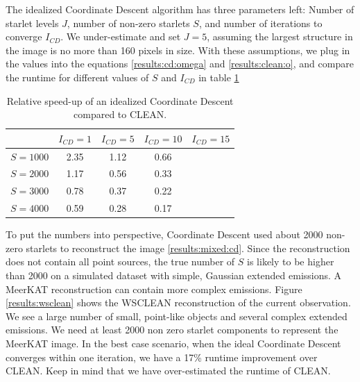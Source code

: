 The idealized Coordinate Descent algorithm has three parameters left: Number of starlet levels $J$, number of non-zero starlets $S$, and number of iterations to converge $I_{CD}$. We under-estimate and set $J=5$, assuming the largest structure in the image is no more than 160 pixels in size. With these assumptions, we plug in the values into the equations \eqref{results:cd:omega} and \eqref{results:clean:o}, and compare the runtime for different values of $S$ and $I_{CD}$ in table \ref{res:cd:table}

\begin{table}[h!]
	\begin{center}
		\begin{tabular}{l|c|c|c|c} %
			 & $I_{CD} = 1$ & $I_{CD} = 5$ &  $I_{CD} = 10$ &  $I_{CD} = 15$\\
			\hline
			$S=1000$ & 2.35 & 1.12 & 0.66 & \\
			$S=2000$ & 1.17 & 0.56 & 0.33 &\\
			$S=3000$ & 0.78 & 0.37 & 0.22 &\\
			$S=4000$ & 0.59 & 0.28 & 0.17 & \\
		\end{tabular}
		\caption{Relative speed-up of an idealized Coordinate Descent compared to CLEAN.}
		\label{res:cd:table}
	\end{center}
\end{table}

To put the numbers into perspective, Coordinate Descent used about 2000 non-zero starlets to reconstruct the image \ref{results:mixed:cd}. Since the reconstruction does not contain all point sources, the true number of $S$ is likely to be higher than 2000 on a simulated dataset with simple, Gaussian extended emissions. A MeerKAT reconstruction can contain more complex emissions. Figure \ref{results:wsclean} shows the WSCLEAN reconstruction of the current observation. We see a large number of small, point-like objects and several complex extended emissions. We need at least 2000 non zero starlet components to represent the MeerKAT image. In the best case scenario, when the ideal Coordinate Descent converges within one iteration, we have a 17\% runtime improvement over CLEAN. Keep in mind that we have over-estimated the runtime of CLEAN.

